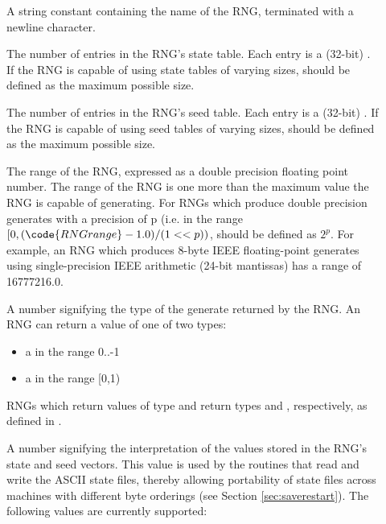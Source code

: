 \begin{description}
\item[] A string constant containing the name of the RNG,
terminated with a newline character.
\item[] The number of entries in the RNG's state
table.  Each entry is a (32-bit) .  If the RNG is
capable of using state tables of varying sizes, 
should be defined as the maximum possible size.
\item[] The number of entries in the RNG's seed table.
Each entry is a (32-bit) .  If the RNG is capable of
using seed tables of varying sizes,  should be
defined as the maximum possible size.
\item[]
\begin{tex} The range of the RNG, expressed as a double
precision floating point number.  The range of the RNG is one more
than the maximum value the RNG is capable of generating.  For RNGs
which produce double precision generates with a precision of p
(i.e. in the range $[0,(\code{RNGrange}-1.0)/(1<<p))$, 
should be defined as $2^{p}$.  For example, an RNG which produces 8-byte
IEEE floating-point generates using single-precision IEEE arithmetic
(24-bit mantissas) has a range of 16777216.0.
\end{tex}
\item[] A number signifying the type of the generate
returned by the RNG.  An RNG can return a value of one of two types:
\begin{itemize}
\item a  in the range 0..-1
\item a  in the range [0,1)
\end{itemize}
RNGs which return values of type  and  return
types  and , respectively, as defined in
.
\item[] A number signifying the interpretation of the
values stored in the RNG's state and seed vectors.  This value is used
by the routines that read and write the ASCII state files, thereby
allowing portability of state files across machines with different byte
orderings (see Section \ref{sec:saverestart}).  The following values
are currently supported:
\begin{tex}
\begin{center}

\end{center}
\end{tex}
\end{description}
